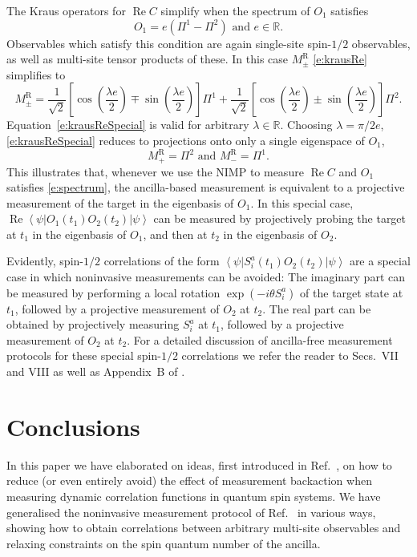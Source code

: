 \documentclass[epjST,numbook]{svjour}
\newcommand\RR{{\mathds{R}}}
\newcommand{\matel}[3]{ \displaystyle \left\langle #1 \right \vert #2 \left\vert  #3 \right\rangle }
\DeclareMathOperator{\rep}{\mathrm{Re}}
\begin{document}
The Kraus operators for $\rep C$ simplify when the spectrum of $O_1$ satisfies
\begin{equation}\label{e:spectrum}
	O_1 =e ( \Pi^1 - \Pi^2) \text{ and } e\in\RR .
\end{equation}
Observables which satisfy this condition are again single-site spin-$1/2$ observables, as well as multi-site tensor products of these.
In this case $M_\pm^\text{R}$ \eqref{e:krausRe} simplifies to
\begin{equation}\label{e:krausReSpecial}
M_\pm^\text{R}= \frac{1}{\sqrt{2}} \left[ \cos \left( \frac{\lambda e}{2} \right) \mp \sin\left(\frac{\lambda e}{2}\right)\right] \Pi^1 + \frac{1}{\sqrt{2}} \left[ \cos \left( \frac{\lambda e}{2} \right) \pm \sin\left(\frac{\lambda e}{2}\right)\right] \Pi^2.
\end{equation}
Equation~\eqref{e:krausReSpecial} is valid for arbitrary $\lambda \in \RR$. Choosing $\lambda=\pi/2e$, \eqref{e:krausReSpecial} reduces to projections onto only a single eigenspace of $O_1$,
\begin{equation}
	M_+^\text{R}=\Pi^2 \text{ and } 	M_-^\text{R}=\Pi^1 .
\end{equation}
This illustrates that, whenever we use the NIMP to measure $\rep C$ and $O_1$ satisfies \eqref{e:spectrum}, the ancilla-based measurement is equivalent to a projective measurement of the target in the eigenbasis of $O_1$. In this special case, $\rep \matel{\psi}{O_1(t_1)O_2(t_2)}{\psi}$ can be measured by projectively probing the target at $t_1$ in the eigenbasis of $O_1$, and then at $t_2$ in the eigenbasis of $O_2$.

Evidently, spin-$1/2$ correlations of the form $\matel{\psi}{S_i^a(t_1)O_2(t_2)}{\psi}$ are a special case in which noninvasive measurements can be avoided: The imaginary part can be measured by performing a local rotation $\exp(-i\theta S_i^a)$ of the target state at $t_1$, followed by a projective measurement of $O_2$ at $t_2$. The real part can be obtained by projectively measuring $S_i^a$ at $t_1$, followed by a projective measurement of $O_2$ at $t_2$. For a detailed discussion of ancilla-free measurement protocols for these special spin-$1/2$ correlations we refer the reader to Secs.~VII and VIII as well as Appendix~B of \cite{Uhrich_etal}.

\section{Conclusions}
In this paper we have elaborated on ideas, first introduced in Ref.~\cite{Uhrich_etal}, on how to reduce (or even entirely avoid) the effect of measurement backaction when measuring dynamic correlation functions in quantum spin systems. We have generalised the noninvasive measurement protocol of Ref.~\cite{Uhrich_etal} in various ways, showing how to obtain correlations between arbitrary multi-site observables and relaxing constraints on the spin quantum number of the ancilla.
\end{document}
